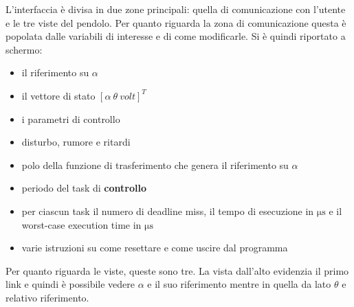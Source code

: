 L'interfaccia \`e divisa in due zone principali: quella di comunicazione con l'utente e le tre viste del pendolo.
Per quanto riguarda la zona di comunicazione questa \`e popolata dalle variabili di interesse e di come modificarle. Si \`e quindi riportato a schermo:
\begin{itemize}
	\item il riferimento su $\alpha$
	
	\item  il vettore di stato $\left[ \alpha \ \theta \ volt\right]^T$
	
	\item i parametri di controllo
	
	\item disturbo, rumore e ritardi
	
	\item polo della funzione di trasferimento che genera il riferimento su $\alpha$
	
	\item periodo del task di \textbf{controllo}
	
	\item per ciascun task il numero di deadline miss, il tempo di esecuzione in $\si{\micro \second}$ e il worst-case execution time in $\si{\micro \second}$
	
	\item varie istruzioni su come resettare e come uscire dal programma
	
\end{itemize}

Per quanto riguarda le viste, queste sono tre. La vista dall'alto evidenzia il primo link e quindi \`e possibile vedere $\alpha$ e il suo riferimento mentre in quella da lato $\theta$ e relativo riferimento.

